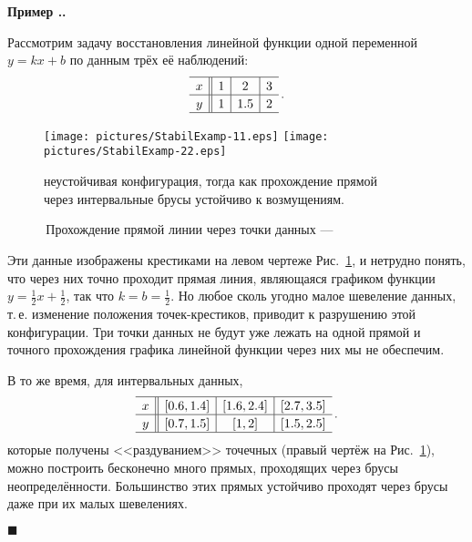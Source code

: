 \documentclass[a5paper,openany]{book}
\newcounter{ExmpNum}[section]
\renewcommand{\theExmpNum}{\thesection.\arabic{ExmpNum}}
\newenvironment{example}%
  {\refstepcounter{ExmpNum}%
  \par\addvspace{\medskipamount} 
  \noindent\textbf{Пример {\theExmpNum}.}
  }%
  {\hfill$\blacksquare$\par\medskip}
\begin{document}
\begin{example} 
Рассмотрим задачу восстановления линейной функции одной переменной $y = kx + b$ 
по данным трёх её наблюдений: 
\begin{equation*} 
\begin{array}{c||c|c|c} 
\hline 
x & 1 &  2  & 3 \rule[-1mm]{0mm}{4.5mm}\\ 
\hline 
y & 1 & 1.5 & 2 \rule[-1mm]{0mm}{4.5mm}\\ 
\hline 
\end{array}\,. 
\end{equation*} 
  
  
\begin{figure}[htb] 
\centering\small  
\texttt{[image: pictures/StabilExamp-11.eps]}  
\hspace{7mm} 
\texttt{[image: pictures/StabilExamp-22.eps]} 
\caption{\,Прохождение прямой линии через точки данных --- } 
неустойчивая конфигурация, тогда как прохождение прямой \\ 
через интервальные брусы устойчиво к возмущениям. 
\label{StabilExmpPic} 
\end{figure}
  
  
Эти данные изображены крестиками на левом чертеже Рис.~\ref{StabilExmpPic}, и 
нетрудно понять, что через них точно проходит прямая линия, являющаяся графиком 
функции $y = \tfrac{1}{2}x + \tfrac{1}{2}$, так что $k = b = \tfrac{1}{2}$. 
Но любое сколь угодно малое шевеление данных, т.\,е. изменение положения 
точек-крестиков, приводит к разрушению этой конфигурации. Три точки данных 
не будут уже лежать на одной прямой и точного прохождения графика линейной 
функции через них мы не обеспечим. 
  
В то же время, для интервальных данных, 
\begin{equation*} 
\begin{array}{c||c|c|c} 
\hline 
x & [0.6, 1.4] & [1.6, 2.4] & [2.7, 3.5] \rule[-1mm]{0mm}{4.5mm}\\ 
\hline 
y & [0.7, 1.5] & [1, 2] & [1.5, 2.5] \rule[-1mm]{0mm}{4.5mm}    \\ 
\hline 
\end{array}\,. 
\end{equation*} 
которые получены <<раздуванием>> точечных (правый чертёж на Рис.~\ref{StabilExmpPic}), 
можно построить бесконечно много прямых, проходящих через брусы неопределённости. 
Большинство этих прямых устойчиво проходят через брусы даже при их малых шевелениях. 
  

\end{example}
\end{document}
